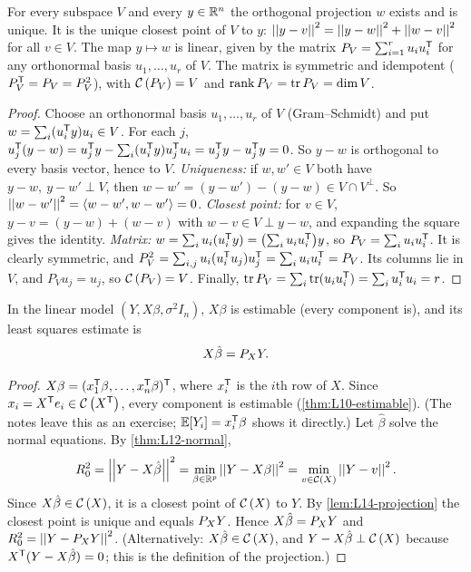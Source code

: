 \begin{lemma}\label{lem:L14-projection}
For every subspace $V$ and every $y\in\mathbb R^n$ the orthogonal projection $w$ exists and is unique. It is the unique
closest point of $V$ to $y$: $\left|\left|y-v\right|\right|^2=\left|\left|y-w\right|\right|^2+\left|\left|w-v\right|\right|^2$ for all $v\in V$. The map $y\mapsto w$ is linear,
given by the matrix $P_V=\sum_{i=1}^r u_iu_i^{\mathsf T}$ for any orthonormal basis $u_1,\dots,u_r$ of $V$. The matrix is symmetric and
idempotent ($P_V^{\mathsf T}=P_V=P_V^2$), with $\mathcal{C}\left(P_V\right)=V$ and $\operatorname{rank} P_V=\operatorname{tr} P_V=\dim V$.
\end{lemma}
\begin{proof}
Choose an orthonormal basis $u_1,\dots,u_r$ of $V$ (Gram--Schmidt) and put $w=\sum_i(u_i^{\mathsf T} y)u_i\in V$. For each $j$,
$u_j^{\mathsf T}(y-w)=u_j^{\mathsf T} y-\sum_i(u_i^{\mathsf T} y)u_j^{\mathsf T} u_i=u_j^{\mathsf T} y-u_j^{\mathsf T} y=0$. So $y-w$ is orthogonal to every basis vector, hence to $V$.
\emph{Uniqueness:} if $w,w'\in V$ both have $y-w,\ y-w'\perp V$, then $w-w'=(y-w')-(y-w)\in V\cap V^\perp$. So
$\left|\left|w-w'\right|\right|^2=\langle w-w',w-w'\rangle=0$.
\emph{Closest point:} for $v\in V$, $y-v=(y-w)+(w-v)$ with $w-v\in V\perp y-w$, and expanding the square gives the
identity. \emph{Matrix:} $w=\sum_iu_i(u_i^{\mathsf T} y)=\bigl(\sum_iu_iu_i^{\mathsf T}\bigr)y$, so $P_V=\sum_iu_iu_i^{\mathsf T}$. It is clearly symmetric, and
$P_V^2=\sum_{i,j}u_i(u_i^{\mathsf T} u_j)u_j^{\mathsf T}=\sum_iu_iu_i^{\mathsf T}=P_V$. Its columns lie in $V$, and $P_Vu_j=u_j$, so $\mathcal{C}\left(P_V\right)=V$. Finally,
$\operatorname{tr} P_V=\sum_i\operatorname{tr}(u_iu_i^{\mathsf T})=\sum_iu_i^{\mathsf T} u_i=r$.
\end{proof}

\begin{proposition}\label{prop:L14-PX}
In the linear model $(Y,X\beta,\sigma^2I_n)$, $X\beta$ is estimable (every component is), and its least squares estimate is
\[
X\hat\beta=P_X Y .
\]
\end{proposition}
\begin{proof}
$X\beta=(x_1^{\mathsf T}\beta,\dots,x_n^{\mathsf T}\beta)^{\mathsf T}$, where $x_i^{\mathsf T}$ is the $i$th row of $X$. Since $x_i=X^{\mathsf T} e_i\in\mathcal{C}\left(X^{\mathsf T}\right)$, every component is
estimable (\cref{thm:L10-estimable}). (The notes leave this as an exercise; $\mathbb E[Y_i]=x_i^{\mathsf T}\beta$ shows it directly.)
Let $\hat\beta$ solve the normal equations. By \cref{thm:L12-normal},
\[
R_0^2=\left|\left|Y-X\hat\beta\right|\right|^2=\min_{\beta\in\mathbb R^p}\left|\left|Y-X\beta\right|\right|^2=\min_{v\in\mathcal{C}\left(X\right)}\left|\left|Y-v\right|\right|^2 .
\]
Since $X\hat\beta\in\mathcal{C}\left(X\right)$, it is a closest point of $\mathcal{C}\left(X\right)$ to $Y$. By \cref{lem:L14-projection} the closest point is unique
and equals $P_X Y$. Hence $X\hat\beta=P_X Y$ and $R_0^2=\left|\left|Y-P_X Y\right|\right|^2$.
(Alternatively: $X\hat\beta\in\mathcal{C}\left(X\right)$, and $Y-X\hat\beta\perp\mathcal{C}\left(X\right)$ because $X^{\mathsf T}(Y-X\hat\beta)=0$; this is the definition of the projection.)
\end{proof}

